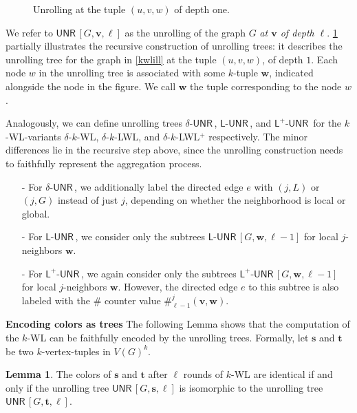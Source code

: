 \documentclass{article}
\newcommand{\xhdr}[1]{{\noindent\bfseries #1}}
\theoremstyle{definition}
\newtheorem{lemma}[theorem]{Lemma}
\newcommand{\new}[1]{\emph{#1}}
\renewcommand{\vec}[1]{\mathbf{#1}}
\newcommand{\kwl}{$k$-\textsf{WL}\xspace}
\newcommand{\deltakwl}{$\delta$-$k$-\textsf{WL}\xspace}
\newcommand{\localkwl}{$\delta$-$k$-\textsf{LWL}\xspace}
\newcommand{\pluskwl}{$\delta$-$k$-\textsf{LWL}$^+$\xspace}
\newcommand{\UNR}{\textsf{UNR}\,}
\newcommand{\deltaunr}{\delta\text{-}\UNR\xspace}
\newcommand{\localunr}{\textsf{L}\text{-}\UNR\xspace}
\newcommand{\plusunr}{\textsf{L}^{\!+}\text{-}\UNR\xspace}
\begin{document}
\begin{figure}
	\caption{Unrolling at the tuple $(u,v,w)$ of depth one.}	\label{rolling_app}
\end{figure}

We refer to $\UNR[G,\vec{v},\ell]$ as the unrolling of the graph $G$ \new{at $\vec{v}$ of depth $\ell$}. \cref{rolling_app} partially illustrates the recursive construction of unrolling trees: it describes the unrolling tree for the graph in \cref{kwlill} at the tuple $(u,v,w)$, of depth $1$. Each node $w$ in the unrolling tree is associated with some $k$-tuple $\vec{w}$, indicated alongside the node in the figure. We call $\vec{w}$ the tuple corresponding to the node $w$.

Analogously, we can define unrolling trees $\deltaunr$, $\localunr$, and $\plusunr$ for the \kwl-variants \deltakwl, \localkwl, and \pluskwl respectively. The minor differences lie in the recursive step above, since the unrolling construction needs to faithfully represent the aggregation process. 

\begin{itemize}
	\item[-] For $\deltaunr$, we additionally label the directed edge $e$ with $(j,L)$ or $(j,G)$ instead of just $j$, depending on whether the neighborhood is local or global. 
	\item[-] For $\localunr$, we consider only the subtrees $\localunr[G,\vec{w},\ell-1]$ for local $j$-neighbors $\vec{w}$. 
	\item[-] For $\plusunr$, we again consider only the subtrees $\plusunr[G,\vec{w},\ell-1]$ for local $j$-neighbors $\vec{w}$. However,
	the directed edge $e$ to this subtree is also labeled with the $\#$ counter value $\#_{\ell-1}^j(\vec{v},\vec{w})$.
\end{itemize}


\xhdr{Encoding colors as trees} The following Lemma shows that the computation of the \kwl can be faithfully encoded by the unrolling trees. 
Formally, let $\vec{s}$ and $\vec{t}$ be two $k$-vertex-tuples in $V(G)^k$.

\begin{lemma}\label{encwl}
	The colors of $\vec{s}$ and $\vec{t}$ after $\ell$ rounds of \kwl are identical 
	if and only if the unrolling tree $\UNR[G,\vec{s},\ell]$ is isomorphic to the unrolling tree $\UNR[G,\vec{t},\ell]$.  
\end{lemma}
\end{document}
